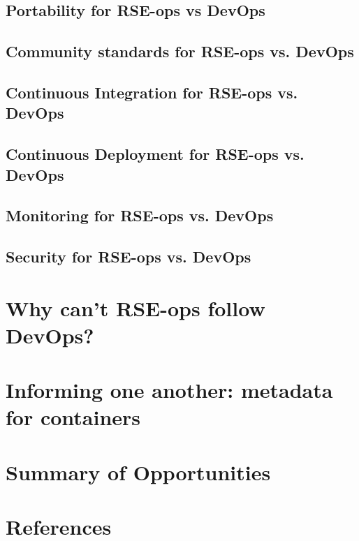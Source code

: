 \documentclass{article}
\begin{document}
\subsection{Portability for RSE-ops vs DevOps}


\subsection{Community standards for RSE-ops vs. DevOps}


\subsection{Continuous Integration for RSE-ops vs. DevOps}


\subsection{Continuous Deployment for RSE-ops vs. DevOps}


\subsection{Monitoring for RSE-ops vs. DevOps}


\subsection{Security for RSE-ops vs. DevOps}




\section{Why can't RSE-ops follow DevOps?}


\section{Informing one another: metadata for containers}




\section{Summary of Opportunities}


\section{References}


\end{document}
